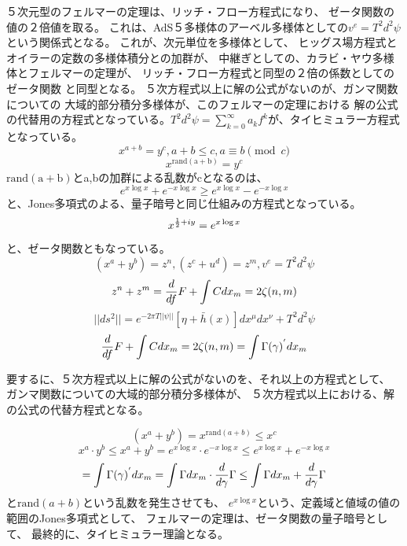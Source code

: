 \documentclass{jsarticle}
\begin{document}
   ５次元型のフェルマーの定理は、リッチ・フロー方程式になり、
   ゼータ関数の値の２倍値を取る。
   これは、AdS５多様体のアーベル多様体としての$v^e = T^2d^2 \psi $
   という関係式となる。 これが、次元単位を多様体として、
   ヒッグス場方程式とオイラーの定数の多様体積分との加群が、
   中継ぎとしての、カラビ・ヤウ多様体とフェルマーの定理が、
   リッチ・フロー方程式と同型の２倍の係数としてのゼータ関数
   と同型となる。
   ５次方程式以上に解の公式がないのが、ガンマ関数についての
   大域的部分積分多様体が、このフェルマーの定理における
   解の公式の代替用の方程式となっている。$ T^2d^2 \psi = \sum
   _{k=0}^{\infty}a_k f^k $が、タイヒミュラー方程式となっている。
   $$ x^{a + b} = y^c, a + b \le c, a \equiv b \pmod{c} $$
   $$ x^{\mathrm{rand(a+b)}} = y^c $$
   $ \mathrm{rand(a+b)}$とa,bの加群による乱数がcとなるのは、
   $$ e^{x\log x} + e^{-x \log x} \ge e^{x \log x} - e^{-x \log x} $$
   と、Jones多項式のよる、量子暗号と同じ仕組みの方程式となっている。
   $$ x^{{1 \over 2} + iy} = e^{x \log x} $$
   と、ゼータ関数ともなっている。
   $$ {(x^a + y^b)} = z^n, {(z^c + u^d)} = z^m, v^e = T^2d^2 \psi $$
   $$ z^n + z^m = {d \over {d f}}F + \int C dx_m = 2\zeta(n,m) $$
   $$ ||ds^2|| = e^{-2\pi T||\psi||}[\eta + \bar{h}(x)]dx^{\mu}dx^{\nu}
   + T^2d^2 \psi $$
   $$  {d \over {d f}}F + \int C dx_m = 2\zeta(n,m) = \int \Gamma(\gamma)^{'}
   dx_m $$

   要するに、５次方程式以上に解の公式がないのを、それ以上の方程式として、
   ガンマ関数についての大域的部分積分多様体が、
   ５次方程式以上における、解の公式の代替方程式となる。

   $$ {(x^a + y^b)} = x^{\mathrm{rand}(a+b)} \le x^c $$
   $$ x^a\cdot y^b \le x^a + y^b = e^{x \log x} \cdot e^{-x \log x}
   \le e^{x \log x} + e^{-x \log x} $$
   $$ = \int \Gamma(\gamma)^{'}dx_m = \int \Gamma dx_m \cdot {d \over {d 
   \gamma}}\Gamma \le \int \Gamma dx_m + {d \over {d \gamma}}\Gamma $$
   と$ \mathrm{rand}(a+b) $という乱数を発生させても、
   $ e^{x \log x} $という、定義域と値域の値の範囲のJones多項式として、
   フェルマーの定理は、ゼータ関数の量子暗号として、
   最終的に、タイヒミュラー理論となる。
\end{document}
